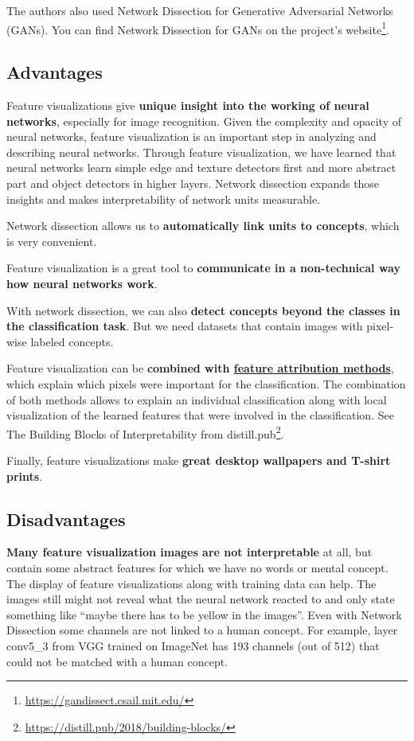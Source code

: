 \documentclass[
  11pt,
]{scrbook}
\renewcommand{\href}[2]{#2\footnote{\url{#1}}}
\begin{document}
The authors also used Network Dissection for Generative Adversarial Networks (GANs).
You can find Network Dissection for GANs on \href{https://gandissect.csail.mit.edu/}{the project's website}.

\hypertarget{advantages-18}{%
\subsection{Advantages}\label{advantages-18}}

Feature visualizations give \textbf{unique insight into the working of neural networks}, especially for image recognition.
Given the complexity and opacity of neural networks, feature visualization is an important step in analyzing and describing neural networks.
Through feature visualization, we have learned that neural networks learn simple edge and texture detectors first and more abstract part and object detectors in higher layers.
Network dissection expands those insights and makes interpretability of network units measurable.

Network dissection allows us to \textbf{automatically link units to concepts}, which is very convenient.

Feature visualization is a great tool to \textbf{communicate in a non-technical way how neural networks work}.

With network dissection, we can also \textbf{detect concepts beyond the classes in the classification task}.
But we need datasets that contain images with pixel-wise labeled concepts.

Feature visualization can be \textbf{combined with \protect\hyperlink{pixel-attribution}{feature attribution methods}}, which explain which pixels were important for the classification.
The combination of both methods allows to explain an individual classification along with local visualization of the learned features that were involved in the classification.
See \href{https://distill.pub/2018/building-blocks/}{The Building Blocks of Interpretability from distill.pub}.

Finally, feature visualizations make \textbf{great desktop wallpapers and T-shirt prints}.

\hypertarget{disadvantages-18}{%
\subsection{Disadvantages}\label{disadvantages-18}}

\textbf{Many feature visualization images are not interpretable} at all, but contain some abstract features for which we have no words or mental concept.
The display of feature visualizations along with training data can help.
The images still might not reveal what the neural network reacted to and only state something like ``maybe there has to be yellow in the images''.
Even with Network Dissection some channels are not linked to a human concept.
For example, layer conv5\_3 from VGG trained on ImageNet has 193 channels (out of 512) that could not be matched with a human concept.
\end{document}
